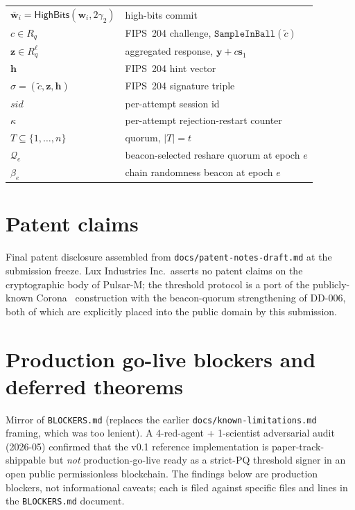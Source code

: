 \documentclass[11pt,a4paper]{article}
\theoremstyle{definition}
\theoremstyle{remark}
\newcommand{\Rq}{R_q}
\newcommand{\HighBits}{\mathsf{HighBits}}
\begin{document}
\begin{center}
\begin{tabular}{l l}
$\bar{\mathbf{w}}_i = \HighBits(\mathbf{w}_i, 2\gamma_2)$ & high-bits commit \\
$c \in \Rq$ & FIPS~204 challenge, $\texttt{SampleInBall}(\tilde c)$ \\
$\mathbf{z} \in \Rq^\ell$ & aggregated response, $\mathbf{y} + c\mathbf{s}_1$ \\
$\mathbf{h}$ & FIPS~204 hint vector \\
$\sigma = (\tilde c, \mathbf{z}, \mathbf{h})$ & FIPS~204 signature triple \\
$\mathit{sid}$ & per-attempt session id \\
$\kappa$ & per-attempt rejection-restart counter \\
$T \subseteq \{1, \dots, n\}$ & quorum, $|T| = t$ \\
$\mathcal{Q}_e$ & beacon-selected reshare quorum at epoch $e$ \\
$\beta_e$ & chain randomness beacon at epoch $e$ \\
\bottomrule
\end{tabular}
\end{center}

\section{Patent claims}
\label{sec:patent}
Final patent disclosure assembled from
\texttt{docs/patent-notes-draft.md} at the submission freeze. Lux
Industries Inc.\ asserts no patent claims on the cryptographic body
of Pulsar-M; the threshold protocol is a port of the publicly-known
Corona~\cite{boschini2024corona} construction with the beacon-quorum
strengthening of DD-006, both of which are explicitly placed into
the public domain by this submission.

\section{Production go-live blockers and deferred theorems}
\label{sec:knownlimits}
Mirror of \texttt{BLOCKERS.md} (replaces the earlier
\texttt{docs/known-limitations.md} framing, which was too lenient).
A 4-red-agent + 1-scientist adversarial audit (2026-05) confirmed
that the v0.1 reference implementation is paper-track-shippable but
\emph{not} production-go-live ready as a strict-PQ threshold signer
in an open public permissionless blockchain. The findings below are
production blockers, not informational caveats; each is filed against
specific files and lines in the \texttt{BLOCKERS.md} document.
\end{document}
